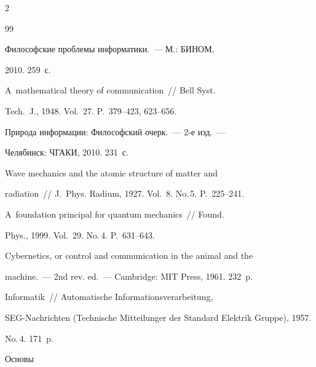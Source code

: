  \begin{multicols}{2}



\renewcommand{\bibname}{\protect\rmfamily Литература}




{\small\frenchspacing

{%

\begin{thebibliography}{99}


 Философские проблемы информатики.~--- М.: БИНОМ, 

2010. 259~с.


 A~mathematical theory of communication~// Bell Syst. 

Tech.~J., 1948. Vol.~27. P.~379--423, 623--656.


 Природа информации: Философский очерк.~--- 2-е изд.~--- 

Челябинск: ЧГАКИ, 2010. 231~с.


 Wave mechanics and the atomic structure of matter and 

radiation~// J.~Phys. Radium, 1927. Vol.~8. No.\,5. P.~225--241.


 A~foundation principal for quantum mechanics~// Found. 

Phys., 1999. Vol.~29. No.\,4. P.~631--643.


 Cybernetics, or control and communication in the animal and the 

machine.~--- 2nd rev. ed.~--- Cambridge: MIT Press, 1961. 232~p.


 Informatik~// Automatische Informationsverarbeitung,  

SEG-Nachrichten (Technische Mitteilunger der Standard Elektrik Gruppe), 1957. 

No.\,4. 171~p.


 Основы 


\end{thebibliography}}}
\end{multicols}
